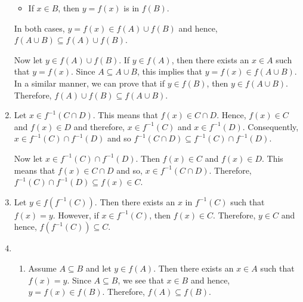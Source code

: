 \begin{enumerate}
\begin{itemize}
\item If $x \in B$, then $y = f \left( x \right)$ is in $f \left( B \right)$.
\end{itemize}
In both cases, $y = f \left( x \right) \in f \left( A \right) \cup f \left( B \right)$ and hence, 
$f \left( A \cup B \right) \subseteq f \left( A \right) \cup f \left( B \right)$.

Now let $y \in f \left( A \right) \cup f \left( B \right)$.  If $y \in f \left( A \right)$, then there exists an $x \in A$ such that $y = f \left( x \right)$.  Since $A \subseteq A \cup B$, this implies that $y = f \left( x \right) \in f \left( A \cup B \right)$.  In a similar manner, we can prove that if $y \in f \left( B \right)$, then $y \in f \left( A \cup B \right)$.  Therefore, 
$f \left( A \right) \cup f \left( B \right) \subseteq f \left( A \cup B \right)$.

\item Let $x \in f^{-1} \left( C \cap D \right)$.  This means that 
$f \left( x \right) \in C \cap D$.  Hence, $f \left( x \right) \in C$ and 
$f \left( x \right) \in D$ and therefore, $x \in f^{-1} \left( C \right)$ and 
$x \in f^{-1} \left( D \right)$.  Consequently, $x \in f^{-1} \left( C \right) \cap f^{-1} \left( D \right)$ and so 
$f^{-1} \left( C \cap D \right) \subseteq f^{-1} \left( C \right) \cap f^{-1} \left( D \right)$.

Now let $x \in f^{-1} \left( C \right) \cap f^{-1} \left( D \right)$.  Then 
$f \left( x \right) \in C$ and $f \left( x \right) \in D$.  This means that 
$f \left( x \right) \in C \cap D$ and so, $x \in f^{-1} \left( C \cap D \right)$.  Therefore, \linebreak
$f^{-1} \left( C \right) \cap f^{-1} \left( D \right) \subseteq f \left( x \right) \in C$.

\item Let $y \in f \left( f^{-1} \left( C \right) \right)$.  Then there exists an $x$ in 
$f^{-1} \left( C \right)$ such that \linebreak
$f \left( x \right) = y$. However, if  $x \in f^{-1} \left( C \right)$, then 
$f \left( x \right) \in C$.  Therefore, $y \in C$ and hence, 
$f \left( f^{-1} \left( C \right) \right) \subseteq C$.



\item \begin{enumerate}
\item  Assume $A \subseteq B$ and let $y \in f \left( A \right)$.  Then there exists an 
$x \in A$ such that $f \left( x \right) = y$.  Since $A \subseteq B$, we see that $x \in B$ and hence, $y = f \left( x \right) \in f \left( B \right)$.  Therefore, 
$f \left( A \right) \subseteq f \left( B \right)$.


\end{enumerate}
\end{enumerate}
